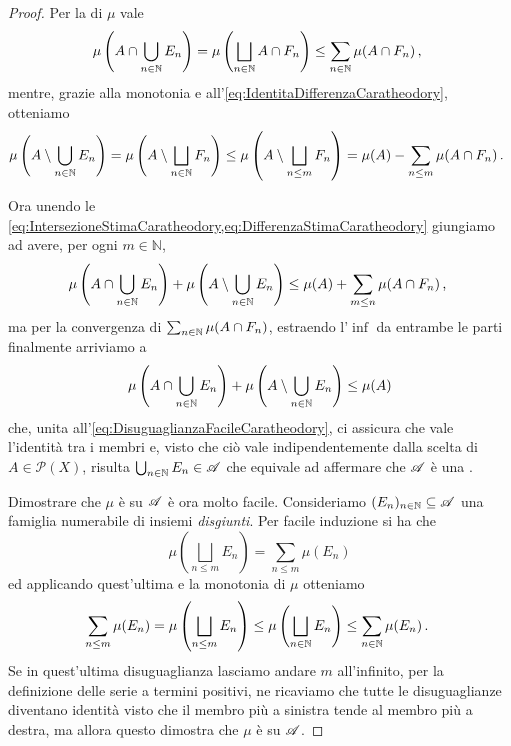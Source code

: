 \begin{proof}
	Per la \sigsubadd[ità] di $\mu$ vale
	\begin{equation}\label{eq:IntersezioneStimaCaratheodory}
		\mu\left(A\cap\bigcup_{n\in\mathbb N} E_n\right)=\mu\left(\bigsqcup_{n\in\mathbb N} A\cap F_n\right)\le
		\sum_{n\in\mathbb N} \mu(A\cap F_n)\, \text{, }
	\end{equation}
	mentre, grazie alla monotonia e all'\cref{eq:IdentitaDifferenzaCaratheodory}, otteniamo
	\begin{equation}\label{eq:DifferenzaStimaCaratheodory}
		\mu\left(A\setminus\bigcup_{n\in\mathbb N} E_n\right) = \mu\left(A\setminus\bigsqcup_{n\in\mathbb N} F_n\right) \le \mu\left(A\setminus\bigsqcup_{n\le m} F_n\right) = 
		\mu(A)-\sum_{n\le m}\mu(A\cap F_n)\, \text{. }
	\end{equation}
	
	Ora unendo le \cref{eq:IntersezioneStimaCaratheodory,eq:DifferenzaStimaCaratheodory} giungiamo ad avere, per ogni $m\in\mathbb{N}$, 
	\begin{equation*}
		\mu\left(A\cap\bigcup_{n\in\mathbb N} E_n\right)+\mu\left(A\setminus\bigcup_{n\in\mathbb N} E_n\right)\le
		\mu(A)+\sum_{m\le n}\mu(A\cap F_n) \, \text{, }
	\end{equation*}
	ma per la convergenza di $\sum_{n\in \mathbb N}\mu(A\cap F_n)$, estraendo l'$\inf$ da entrambe le parti finalmente arriviamo a
	\begin{equation*}
		\mu\left(A\cap\bigcup_{n\in\mathbb N} E_n\right)+\mu\left(A\setminus\bigcup_{n\in\mathbb N} E_n\right)\le
		\mu(A)
	\end{equation*}
	che, unita all'\cref{eq:DisuguaglianzaFacileCaratheodory}, ci assicura che vale l'identità tra i membri e, visto che ciò vale indipendentemente dalla scelta di $A\in\mathcal P(X)$, risulta $\bigcup_{n\in\mathbb N}E_n\in\mathscr A$ che equivale ad affermare che $\mathscr A$ è una \sigalg{}.
	
	Dimostrare che $\mu$ è \sigadd{} su $\mathscr A$ è ora molto facile.
	Consideriamo $(E_n)_{n\in\mathbb N}\subseteq \mathscr A$ una famiglia numerabile di insiemi \emph{disgiunti}. Per facile induzione si ha che
	\begin{equation*}
		\mu\left(\bigsqcup_{n\le m}E_n\right)=\sum_{n\le m} \mu(E_n)
	\end{equation*}
	ed applicando quest'ultima e la monotonia di $\mu$ otteniamo 
	\begin{equation*}
		\sum_{n\le m} \mu(E_n)=\mu\left(\bigsqcup_{n\le m}E_n\right)\le
		\mu\left(\bigsqcup_{n\in\mathbb N}E_n\right)\le \sum_{n\in\mathbb N} \mu(E_n) \, \text{. }
	\end{equation*}
	Se in quest'ultima disuguaglianza lasciamo andare $m$ all'infinito, per la definizione delle serie a termini positivi, ne ricaviamo che tutte le disuguaglianze diventano identità visto che il membro più a sinistra tende al membro più a destra, ma allora questo dimostra che $\mu$ è \sigadd{} su $\mathscr A$.
	

\end{proof}
